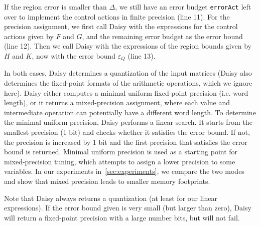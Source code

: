 
If the region error is smaller than $\Delta$, we still have an error budget \texttt{errorAct} left
over to implement the control actions in finite precision (line 11).
For the precision assignment, we first call Daisy with the expressions for the
control actions given by $F$ and $G$, and the remaining error
budget as the error bound (line 12).
Then we call Daisy with the expressions of the region bounds given by $H$
and $K$, now with the error bound $\varepsilon_Q$ (line 13).

In both cases, Daisy determines a quantization of the input matrices (Daisy also
determines the fixed-point formats of the arithmetic operations, which we ignore here).
Daisy either computes a minimal uniform fixed-point precision (i.e. word length),
or it returns a mixed-precision assignment, where each value and
intermediate operation can potentially have a different word length.
To determine the minimal uniform precision, Daisy performs a linear search.
It starts from the smallest precision (1 bit) and checks whether it satisfies the
error bound. If not, the precision is increased by 1 bit and the first precision
that satisfies the error bound is returned.
Minimal uniform precision is used as a starting point for mixed-precision tuning,
which attempts to assign a lower precision to some variables. 
In our experiments in~\autoref{sec:experiments}, we compare the two modes and show
that mixed precision leads to smaller memory footprints.

Note that Daisy always returns a quantization (at least for our linear
expressions). If the error bound given is very small (but larger than zero),
Daisy will return a fixed-point precision with a large number bits, but will not
fail.


